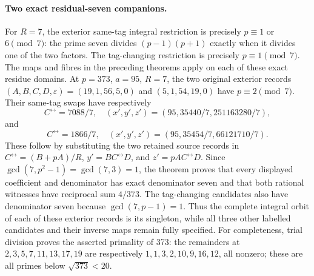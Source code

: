 \paragraph{Two exact residual-seven companions.}
For \(R=7\), the exterior same-tag integral restriction is
precisely \(p\equiv1\) or \(6\pmod7\): the prime seven
divides \((p-1)(p+1)\) exactly when it divides one of the two
factors. The tag-changing restriction is precisely
\(p\equiv1\pmod7\). The maps and fibres in the preceding
theorems apply on each of these exact residue domains.
At \(p=373\), \(a=95\), \(R=7\), the two original exterior
records \((A,B,C,D,\varepsilon)=(19,1,56,5,0)\) and
\((5,1,54,19,0)\) have \(p\equiv2\pmod7\).
Their same-tag swaps have respectively
\[
 C^{\leftrightarrow}=7088/7,\quad
 (x',y',z')=(95,35440/7,251163280/7),
\]
and
\[
 C^{\leftrightarrow}=1866/7,\quad
 (x',y',z')=(95,35454/7,66121710/7).
\]
These follow by substituting the two retained source records in
\(C^{\leftrightarrow}=(B+pA)/R\),
\(y'=BC^{\leftrightarrow}D\), and
\(z'=pAC^{\leftrightarrow}D\). Since
\(\gcd(7,p^2-1)=\gcd(7,3)=1\), the theorem proves that
every displayed coefficient and denominator has exact denominator
seven and that both rational witnesses have reciprocal sum \(4/373\).
The tag-changing candidates also have denominator seven because
\(\gcd(7,p-1)=1\). Thus the complete integral orbit of each
of these exterior records is its singleton, while all three other
labelled candidates and their inverse maps remain fully specified.
For completeness, trial division proves the asserted primality of
373: the remainders at \(2,3,5,7,11,13,17,19\) are respectively
\(1,1,3,2,10,9,16,12\), all nonzero; these are all primes below
\(\sqrt{373}<20\).
